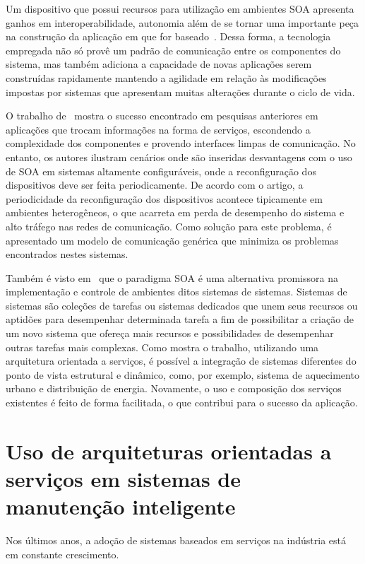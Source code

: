 Um dispositivo que possui recursos para utilização em ambientes \gls{SOA} apresenta ganhos em
interoperabilidade, autonomia além de se tornar uma importante peça na construção da aplicação em
que for baseado~\cite{candido2010industrial}. Dessa forma, a tecnologia empregada não só provê um
padrão de comunicação entre os componentes do sistema, mas também adiciona a capacidade de novas
aplicações serem construídas rapidamente mantendo a agilidade em relação às modificações impostas
por sistemas que apresentam muitas alterações durante o ciclo de vida.

O trabalho de~\cite{ribeiro2008generic} mostra o sucesso encontrado em pesquisas anteriores em
aplicações que trocam informações na forma de serviços, escondendo a complexidade dos componentes e
provendo interfaces limpas de comunicação. No entanto, os autores ilustram cenários onde são
inseridas desvantagens com o uso de \gls{SOA} em sistemas altamente configuráveis, onde a
reconfiguração dos dispositivos deve ser feita periodicamente. De acordo com o artigo, a
periodicidade da reconfiguração dos dispositivos acontece tipicamente em ambientes heterogêneos, o
que acarreta em perda de desempenho do sistema e alto tráfego nas redes de comunicação. Como solução
para este problema, é apresentado um modelo de comunicação genérica que minimiza os problemas
encontrados nestes sistemas.

Também é visto em~\cite{nagorny2013engineering} que o paradigma \gls{SOA} é uma alternativa
promissora na implementação e controle de ambientes ditos sistemas de sistemas. Sistemas de sistemas
são coleções de tarefas ou sistemas dedicados que unem seus recursos ou aptidões para desempenhar
determinada tarefa a fim de possibilitar a criação de um novo sistema que ofereça mais recursos e
possibilidades de desempenhar outras tarefas mais complexas. Como mostra o trabalho, utilizando uma
arquitetura orientada a serviços, é possível a integração de sistemas diferentes do ponto de vista
estrutural e dinâmico, como, por exemplo, sistema de aquecimento urbano e distribuição de energia.
Novamente, o uso e composição dos serviços existentes é feito de forma facilitada, o que contribui
para o sucesso da aplicação.


\section{Uso de arquiteturas orientadas a serviços em sistemas de manutenção inteligente}

Nos últimos anos, a adoção de sistemas baseados em serviços na indústria está em constante
crescimento.


